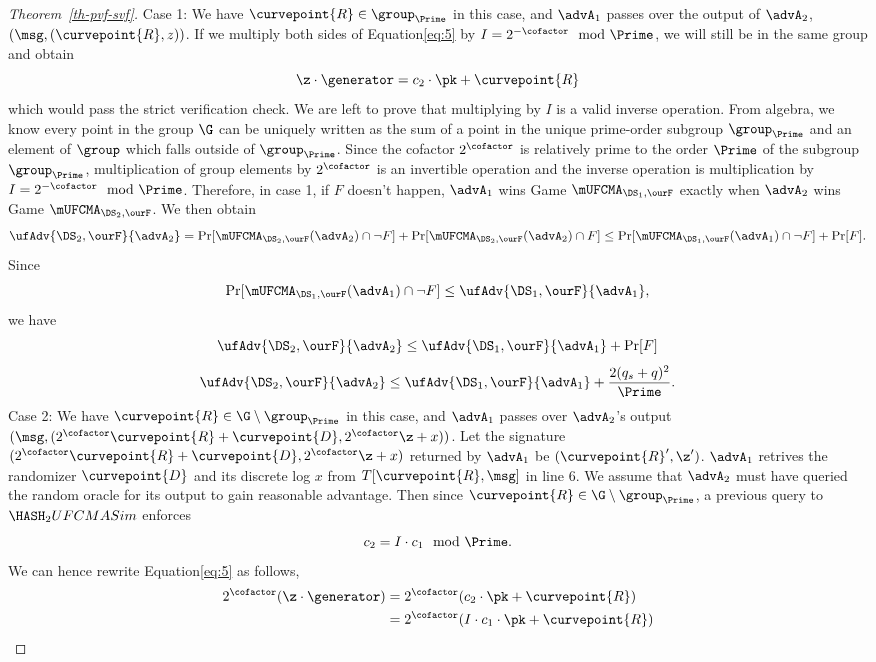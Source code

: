 \begin{proof}[Theorem~\ref{th-pvf-svf}]
	Case 1: We have $\curvepoint{R} \in \group_{\Prime}$ in this case, and $\advA_1$ passes over the output of $\advA_2$, $(\msg, (\curvepoint{R}, z))$.
	If we multiply both sides of Equation\eqref{eq:5} by $I=2^{-\cofactor} \mod \Prime$, we will still be in the same group and obtain
	\[\z \cdot  \generator = c_2 \cdot \pk + \curvepoint{R}\] which would pass the strict verification check. We are left to prove that multiplying by $I$ is a valid inverse operation. From algebra, we know every point in the group $\G$ can be uniquely written as the sum of a point in the unique prime-order subgroup $\group_{\Prime}$ and an element of $\group$ which falls outside of $\group_{\Prime}$. Since the  cofactor $2^\cofactor$ is relatively prime to the order $\Prime$ of the subgroup $\group_{\Prime}$, multiplication of group elements by $2^\cofactor$ is an invertible operation and the inverse operation is multiplication by $I = 2^{-\cofactor} \mod \Prime$. 
	Therefore, in case 1, if $F$ doesn't happen, $\advA_1$ wins Game $\mUFCMA_{\DS_1,\ourF}$ exactly when $\advA_2$ wins Game $\mUFCMA_{\DS_2,\ourF}$. We then obtain
	\[\ufAdv{\DS_2, \ourF}{\advA_2} = \Pr[\mUFCMA_{\DS_2,\ourF}(\advA_2) \cap \neg F] +  \Pr[\mUFCMA_{\DS_2,\ourF}(\advA_2) \cap F] \leq \Pr[\mUFCMA_{\DS_1,\ourF}(\advA_1) \cap \neg F] + \Pr[F] .\] 
	Since 
	\[ \Pr[\mUFCMA_{\DS_1,\ourF}(\advA_1) \cap \neg F] \leq \ufAdv{\DS_1, \ourF}{\advA_1} ,\]
	we have
	\[\ufAdv{\DS_2, \ourF}{\advA_2} \leq \ufAdv{\DS_1, \ourF}{\advA_1} + \Pr[F]\]
	\[\ufAdv{\DS_2, \ourF}{\advA_2} \leq \ufAdv{\DS_1, \ourF}{\advA_1} +  \frac{2(q_s + q)^2}{\Prime}.\]
	Case 2: We have $\curvepoint{R} \in \G \setminus \group_{\Prime}$ in this case, and $\advA_1$ passes over $\advA_2$'s output $(\msg, (2^\cofactor\curvepoint{R} + \curvepoint{D}, 2^\cofactor\z + x))$. Let the signature $(2^\cofactor\curvepoint{R} + \curvepoint{D}, 2^\cofactor\z + x)$ returned by $\advA_1$ be $(\curvepoint{R}', \z')$. $\advA_1$ retrives the randomizer $\curvepoint{D}$ and its discrete log $x$ from $T[\curvepoint{R},  \msg]$ in line 6. We assume that $\advA_2$ must have queried the random oracle for its output to gain reasonable advantage. Then since $\curvepoint{R} \in \G \setminus \group_{\Prime}$, a previous query to $\HASH_2UFCMASim$ enforces 
	\[c_2 =  I \cdot c_1 \mod \Prime.\]
	We can hence rewrite Equation\eqref{eq:5}  as follows,
	\begin{align*} 
		2^\cofactor(\z \cdot  \generator) &= 2^\cofactor (c_2 \cdot \pk+ \curvepoint{R}) \\
		&=  2^\cofactor (I \cdot c_1 \cdot \pk + \curvepoint{R})\\

\end{align*}
\end{proof}
